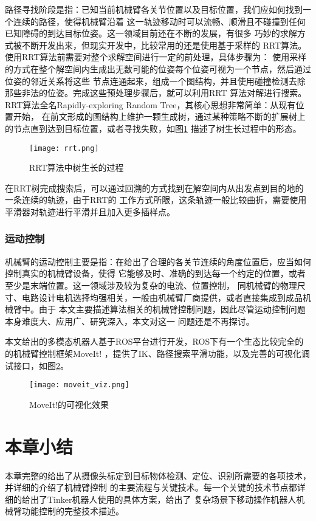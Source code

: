 路径寻找阶段是指：已知当前机械臂各关节位置以及目标位置，我们应如何找到一个连续的路径，使得机械臂沿着
这一轨迹移动时可以流畅、顺滑且不碰撞到任何已知障碍的到达目标位姿。这一领域目前还在不断的发展，有很多
巧妙的求解方式被不断开发出来\cite{masehian2007classic}，但现实开发中，比较常用的还是使用基于采样的
RRT\cite{lavalle1998rapidly}算法。使用RRT算法前需要对整个求解空间进行一定的前处理，具体步骤为：
使用采样的方式在整个解空间内生成出无数可能的位姿每个位姿可视为一个节点，然后通过位姿的邻近关系将这些
节点连通起来，组成一个图结构，并且使用碰撞检测去除那些非法的位姿。完成这些预处理步骤后，就可以利用RRT
算法对解进行搜索。RRT算法全名Rapidly-exploring Random Tree，其核心思想非常简单：从现有位置开始，
在前文形成的图结构上维护一颗生成树，通过某种策略不断的扩展树上的节点直到达到目标位置，或者寻找失败，如图\ref{fig:rrt}
描述了树生长过程中的形态。

\begin{figure}[h] %
  \centering
  \texttt{[image: rrt.png]}
  \caption{RRT算法中树生长的过程\cite{kuffner2000rrt}}
  \label{fig:rrt}
\end{figure}

在RRT树完成搜索后，可以通过回溯的方式找到在解空间内从出发点到目的地的一条连续的轨迹，由于RRT的
工作方式所限，这条轨迹一般比较曲折，需要使用平滑器对轨迹进行平滑并且加入更多插样点。

\subsubsection{运动控制}

机械臂的运动控制主要是指：在给出了合理的各关节连续的角度位置后，应当如何控制真实的机械臂设备，使得
它能够及时、准确的到达每一个约定的位置，或者至少是末端位置。这一领域涉及较为复杂的电流、位置控制，
同机械臂的物理尺寸、电路设计电机选择均强相关，一般由机械臂厂商提供，或者直接集成到成品机械臂中。由于
本文主要描述算法相关的机械臂控制问题，因此尽管运动控制问题本身难度大、应用广、研究深入，本文对这一
问题还是不再探讨。


本文给出的多模态机器人基于ROS平台进行开发，ROS下有一个生态比较完全的的机械臂控制框架MoveIt!\citep{chitta2012moveit}
，提供了IK、路径搜索平滑功能，以及完善的可视化调试接口，如图\ref{fig:moveit_viz}。

\begin{figure}[h] %
  \centering
  \texttt{[image: moveit\_viz.png]}
  \caption{MoveIt!的可视化效果}
  \label{fig:moveit_viz}
\end{figure}


\section{本章小结}

本章完整的给出了从摄像头标定到目标物体检测、定位、识别所需要的各项技术，并详细的介绍了机械臂控制
的主要流程与关键技术。每一个关键的技术节点都详细的给出了Tinker机器人使用的具体方案，给出了
复杂场景下移动操作机器人机械臂功能控制的完整技术描述。






















